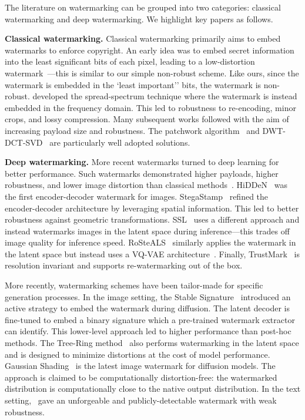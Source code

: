 \documentclass[12pt]{article}
\begin{document}
The literature on watermarking can be grouped into two categories: classical watermarking and deep watermarking. 
We highlight key papers as follows.

\textbf{Classical watermarking.} Classical watermarking primarily aims to embed watermarks to enforce copyright.
An early idea was to embed secret information into the least significant bits of each pixel, leading to a low-distortion watermark~\citep{wolfgang1996watermark}---this is similar to our simple non-robust scheme.
Like ours, since the watermark is embedded in the `least important'' bits, the watermark is non-robust.
\citet{cox1997secure} developed the spread-spectrum technique where the watermark is instead embedded in the frequency domain.
This led to robustness to re-encoding, minor crops, and lossy compression.
Many subsequent works followed with the aim of increasing payload size and robustness.
The patchwork algorithm~\citep{yeo2003generalized} and DWT-DCT-SVD~\citep{navas2008dwt} are particularly well adopted solutions.

\textbf{Deep watermarking.} 
More recent watermarks turned to deep learning for better performance.
Such watermarks demonstrated higher payloads, higher robustness, and lower image distortion than classical methods~\citep{wan2022comprehensive}.
HiDDeN~\citep{zhu2018hidden} was the first encoder-decoder watermark for images.
StegaStamp~\citep{tancik2020stegastamp} refined the encoder-decoder architecture by leveraging spatial information. 
This led to better robustness against geometric transformations.
SSL~\citep{fernandez2022watermarking} uses a different approach and instead watermarks images in the latent space during inference---this trades off image quality for inference speed.
RoSteALS~\citep{bui2023rosteals} similarly applies the watermark in the latent space but instead uses a VQ-VAE architecture~\citep{van2017neural}.
Finally, TrustMark~\citep{bui2023trustmark} is resolution invariant and supports re-watermarking out of the box.

More recently, watermarking schemes have been tailor-made for specific generation processes.
In the image setting, the Stable Signature~\citep{fernandez2023stable} introduced an active strategy to embed the watermark during diffusion. 
The latent decoder is fine-tuned to embed a binary signature which a pre-trained watermark extractor can identify. 
This lower-level approach led to higher performance than post-hoc methods.
The Tree-Ring method~\citep{wen2023tree} also performs watermarking in the latent space and is designed to minimize distortions at the cost of model performance.
Gaussian Shading~\citep{yang2024gaussian} is the latest image watermark for diffusion models.
The approach is claimed to be computationally distortion-free: the watermarked distribution is computationally close to the native output distribution.
In the text setting,~\citet{fairoze2023publicly} gave an unforgeable and publicly-detectable watermark with weak robustness.
\end{document}
